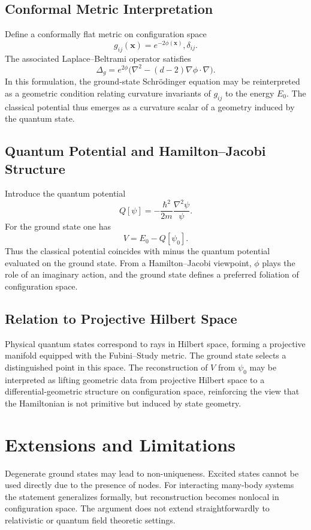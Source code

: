 \documentclass[11pt]{article}
\begin{document}
\subsection{Conformal Metric Interpretation}
Define a conformally flat metric on configuration space
\begin{equation}
g_{ij}(\mathbf{x}) = e^{-2\phi(\mathbf{x})},\delta_{ij}.
\end{equation}
The associated Laplace--Beltrami operator satisfies
\begin{equation}
\Delta_g = e^{2\phi}\bigl(\nabla^2 - (d-2)\nabla \phi \cdot \nabla\bigr).
\end{equation}
In this formulation, the ground-state Schr\"odinger equation may be reinterpreted as a geometric condition relating curvature invariants of $g_{ij}$ to the energy $E_0$. The classical potential thus emerges as a curvature scalar of a geometry induced by the quantum state.

\subsection{Quantum Potential and Hamilton--Jacobi Structure}
Introduce the quantum potential
\begin{equation}
Q[\psi] = -\frac{\hbar^2}{2m}\frac{\nabla^2\psi}{\psi}.
\end{equation}
For the ground state one has
\begin{equation}
V = E_0 - Q[\psi_0].
\end{equation}
Thus the classical potential coincides with minus the quantum potential evaluated on the ground state. From a Hamilton--Jacobi viewpoint, $\phi$ plays the role of an imaginary action, and the ground state defines a preferred foliation of configuration space.

\subsection{Relation to Projective Hilbert Space}
Physical quantum states correspond to rays in Hilbert space, forming a projective manifold equipped with the Fubini--Study metric. The ground state selects a distinguished point in this space. The reconstruction of $V$ from $\psi_0$ may be interpreted as lifting geometric data from projective Hilbert space to a differential-geometric structure on configuration space, reinforcing the view that the Hamiltonian is not primitive but induced by state geometry.

\section{Extensions and Limitations}
Degenerate ground states may lead to non-uniqueness. Excited states cannot be used directly due to the presence of nodes. For interacting many-body systems the statement generalizes formally, but reconstruction becomes nonlocal in configuration space. The argument does not extend straightforwardly to relativistic or quantum field theoretic settings.
\end{document}

